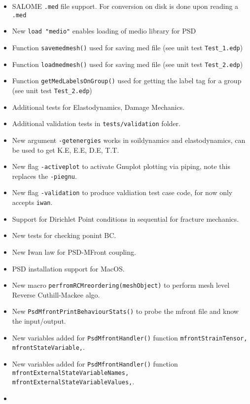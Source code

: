 \begin{itemize}
\tightlist
\item
  SALOME \lstinline!.med! file support. For conversion on disk is done
  upon reading a \lstinline!.med!
\item
  New \lstinline!load "medio"! enables loading of medio library for PSD
\item
  Function \lstinline!savemedmesh()! used for saving med file (see unit
  test \lstinline!Test_1.edp!)
\item
  Function \lstinline!loadmedmesh()! used for saving med file (see unit
  test \lstinline!Test_2.edp!)
\item
  Function \lstinline!getMedLabelsOnGroup()! used for getting the label
  tag for a group (see unit test \lstinline!Test_2.edp!)
\item
  Additional tests for Elastodynamics, Damage Mechanics.
\item
  Additional validation tests in \lstinline!tests/validation! folder.
\item
  New argument \lstinline!-getenergies! works in soildynamics and
  elastodynamics, can be used to get K.E, E.E, D.E, T.T.
\item
  New flag \lstinline!-activeplot! to activate Gnuplot plotting via
  piping, note this replaces the \lstinline!-piegnu!.
\item
  New flag \lstinline!-validation! to produce valdiation test case code,
  for now only accepts \lstinline!iwan!.
\item
  Support for Dirichlet Point conditions in sequential for fracture
  mechanics.
\item
  New tests for checking ponint BC.
\item
  New Iwan law for PSD-MFront coupling.
\item
  PSD installation support for MacOS.
\item
  New macro \lstinline!perfromRCMreordering(meshObject)! to perform mesh
  level Reverse Cuthill-Mackee algo.
\item
  New \lstinline!PsdMfrontPrintBehaviourStats()! to probe the mfront
  file and know the input/output.
\item
  New variables added for \lstinline!PsdMfrontHandler()! function
  \lstinline!mfrontStrainTensor, mfrontStateVariable,!.
\item
  New variables added for \lstinline!PsdMfrontHandler()! function
  \lstinline!mfrontExternalStateVariableNames, mfrontExternalStateVariableValues,!.
\item

\end{itemize}
